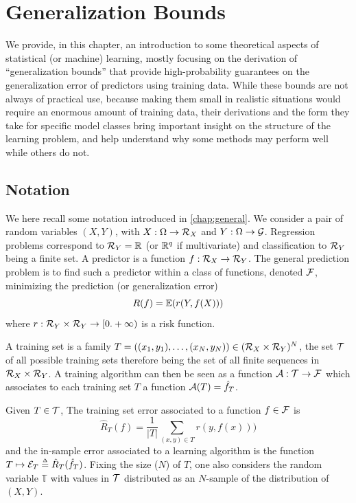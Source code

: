 \chapter{Generalization Bounds}
\label{chap:ms}

We provide, in this chapter, an introduction to some theoretical aspects of  statistical (or machine) learning, mostly focusing on the derivation of ``generalization bounds'' that provide high-probability guarantees on the generalization error of predictors using training data. While these bounds are not always of practical  use, because  making them small
in realistic situations would require an enormous amount of training
data, their derivations and the form they take for specific model classes bring important insight on the structure of the learning problem, and help understand why some methods may perform well while others do not. 

\section{Notation}

We here recall some notation  introduced in \cref{chap:general}. We consider a pair of random variables $(X,Y)$, with $X:\Omega\to{\mathcal R}_X$ and $Y:\Omega \to {\mathcal G}$. Regression problems correspond to ${\mathcal R}_Y = {\mathbb{R}}$ (or ${\mathbb{R}}^q$ if multivariate) and classification to ${\mathcal R}_Y$ being a finite set. A predictor is a function $f: {\mathcal R}_X\to{\mathcal R}_Y$. The general prediction problem is to find such a predictor within a class of functions, denoted ${\mathcal F}$, minimizing the prediction (or generalization error)
\[
R(f) = \bm{\mathbb E}(r(Y, f(X)))
\]
where $r: {\mathcal R}_Y\times{\mathcal R}_Y \to [0. +\infty)$ is a risk function. 

A training set is a family $T = ((x_1, y_1), \ldots, (x_N, y_N)) \in ({\mathcal R}_X\times {\mathcal R}_Y)^N$, the set ${\mathcal T}$ of all possible training sets  therefore being the set of all finite sequences in ${\mathcal R}_X\times {\mathcal R}_Y$. A training algorithm can then be seen as a function ${\mathcal A}: {\mathcal T} \to {\mathcal F}$ which associates to each training set $T$ a function ${\mathcal A}(T) = \hat f_T$. 
\bigskip

Given $T \in {\mathcal T}$, The training set error associated to a function $f\in {\mathcal F}$ is
\[
\hat R_T(f) = \frac{1}{|T|} \sum_{(x,y)\in T} r(y, f(x)))
\]
and the in-sample error associated to a learning algorithm is the function $T \mapsto {\mathcal E}_T \stackrel{{\scriptscriptstyle \Delta}}{=} \hat R_T(\hat f_T)$.  Fixing the size ($N$) of $T$, one also considers the random variable $\mathbb T$ with values in ${\mathcal T}$ distributed as an $N$-sample of the distribution of $(X,Y)$. 

